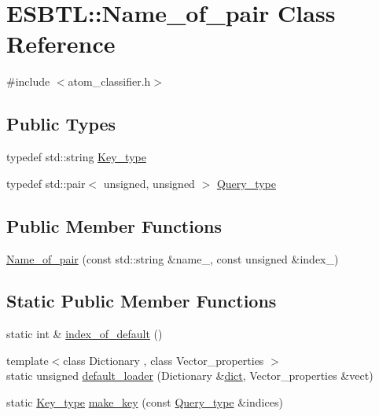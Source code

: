 \hypertarget{classESBTL_1_1Name__of__pair}{}\section{E\+S\+B\+TL\+:\+:Name\+\_\+of\+\_\+pair Class Reference}
\label{classESBTL_1_1Name__of__pair}


{\ttfamily \#include $<$atom\+\_\+classifier.\+h$>$}

\subsection*{Public Types}
\begin{DoxyCompactItemize}
\item 
typedef std\+::string \hyperlink{classESBTL_1_1Name__of__pair_af5890e369891d99cc6db0b7d9e9f882f}{Key\+\_\+type}
\item 
typedef std\+::pair$<$ unsigned, unsigned $>$ \hyperlink{classESBTL_1_1Name__of__pair_a75882a894530f0974e91933d4fe0f89b}{Query\+\_\+type}
\end{DoxyCompactItemize}
\subsection*{Public Member Functions}
\begin{DoxyCompactItemize}
\item 
\hyperlink{classESBTL_1_1Name__of__pair_a93ea9cdffb72da75fb945a77750acf82}{Name\+\_\+of\+\_\+pair} (const std\+::string \&name\+\_\+, const unsigned \&index\+\_\+)
\end{DoxyCompactItemize}
\subsection*{Static Public Member Functions}
\begin{DoxyCompactItemize}
\item 
static int \& \hyperlink{classESBTL_1_1Name__of__pair_a7c9a9315508db058e2defe2ca8c62ea9}{index\+\_\+of\+\_\+default} ()
\item 
{\footnotesize template$<$class Dictionary , class Vector\+\_\+properties $>$ }\\static unsigned \hyperlink{classESBTL_1_1Name__of__pair_a72aed6b4391404f30ac1e4eccb7ce14a}{default\+\_\+loader} (Dictionary \&\hyperlink{Tsai__jmb__99__radii_8h_a3175002a2df717ae9e433cd2210fea97}{dict}, Vector\+\_\+properties \&vect)
\item 
static \hyperlink{classESBTL_1_1Name__of__pair_af5890e369891d99cc6db0b7d9e9f882f}{Key\+\_\+type} \hyperlink{classESBTL_1_1Name__of__pair_ab9ae8abbd84705409e567c2c3628244c}{make\+\_\+key} (const \hyperlink{classESBTL_1_1Name__of__pair_a75882a894530f0974e91933d4fe0f89b}{Query\+\_\+type} \&indices)
\end{DoxyCompactItemize}
